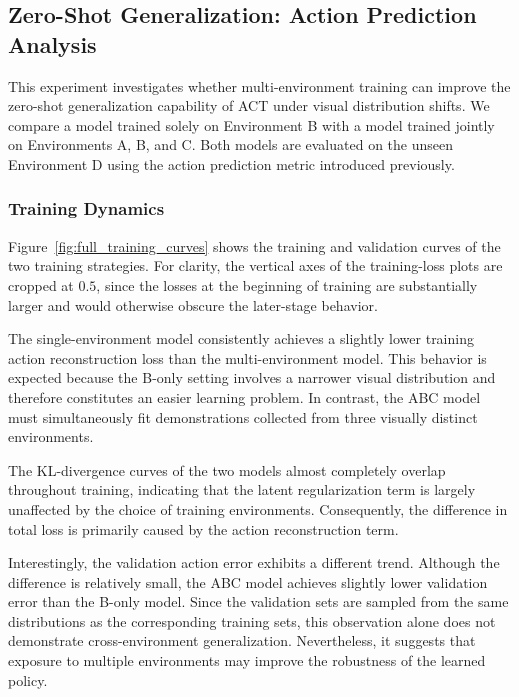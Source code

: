 \subsection{Zero-Shot Generalization: Action Prediction Analysis}

This experiment investigates whether multi-environment training can improve the zero-shot generalization capability of ACT under visual distribution shifts. We compare a model trained solely on Environment B with a model trained jointly on Environments A, B, and C. Both models are evaluated on the unseen Environment D using the action prediction metric introduced previously.

\subsubsection{Training Dynamics}

Figure~\ref{fig:full_training_curves} shows the training and validation curves of the two training strategies. For clarity, the vertical axes of the training-loss plots are cropped at $0.5$, since the losses at the beginning of training are substantially larger and would otherwise obscure the later-stage behavior.

The single-environment model consistently achieves a slightly lower training action reconstruction loss than the multi-environment model. This behavior is expected because the B-only setting involves a narrower visual distribution and therefore constitutes an easier learning problem. In contrast, the ABC model must simultaneously fit demonstrations collected from three visually distinct environments.

The KL-divergence curves of the two models almost completely overlap throughout training, indicating that the latent regularization term is largely unaffected by the choice of training environments. Consequently, the difference in total loss is primarily caused by the action reconstruction term.

Interestingly, the validation action error exhibits a different trend. Although the difference is relatively small, the ABC model achieves slightly lower validation error than the B-only model. Since the validation sets are sampled from the same distributions as the corresponding training sets, this observation alone does not demonstrate cross-environment generalization. Nevertheless, it suggests that exposure to multiple environments may improve the robustness of the learned policy.

